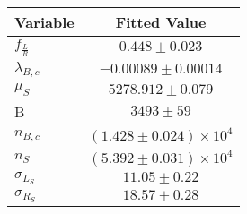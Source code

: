 \begin{tabular}[t]{lc}
\hline
Variable &Fitted Value\\
\hline\hline
$f_{\frac{L}{R}}$&$0.448\pm0.023$\\
\hline
$\lambda_{B,c}$&$-0.00089\pm0.00014$\\
\hline
$\mu_S$&$5278.912\pm0.079$\\
\hline
B&$3493\pm59$\\
\hline
$n_{B,c}$&$(1.428\pm0.024)\times 10^4$\\
\hline
$n_S$&$(5.392\pm0.031)\times 10^4$\\
\hline
$\sigma_{L_S}$&$11.05\pm0.22$\\
\hline
$\sigma_{R_S}$&$18.57\pm0.28$\\
\hline
\end{tabular}